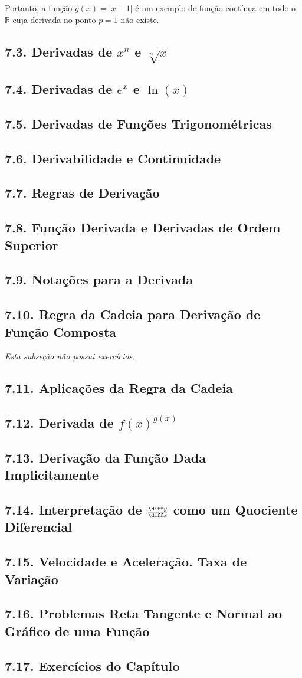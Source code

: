 Portanto, a função $g(x) = |x - 1|$ é um exemplo de função contínua em todo o $\mathbb{R}$ cuja derivada no ponto $p = 1$ não existe.
\subsection*{7.3. Derivadas de $x^n$ e $\sqrt[n]{x}$}
\subsection*{7.4. Derivadas de $e^x$ e $\ln(x)$}
\subsection*{7.5. Derivadas de Funções Trigonométricas}
\subsection*{7.6. Derivabilidade e Continuidade}
\subsection*{7.7. Regras de Derivação}
\subsection*{7.8. Função Derivada e Derivadas de Ordem Superior}
\subsection*{7.9. Notações para a Derivada}
\subsection*{7.10. Regra da Cadeia para Derivação de Função Composta}
\textit{Esta subseção não possui exercícios.}
\subsection*{7.11. Aplicações da Regra da Cadeia}
\subsection*{7.12. Derivada de $f(x)^{g(x)}$}
\subsection*{7.13. Derivação da Função Dada Implicitamente}
\subsection*{7.14. Interpretação de $\frac{\diff y}{\diff x}$ como um Quociente Diferencial}
\subsection*{7.15. Velocidade e Aceleração. Taxa de Variação}
\subsection*{7.16. Problemas Reta Tangente e Normal ao Gráfico de uma Função}
\subsection*{7.17. Exercícios do Capítulo}
